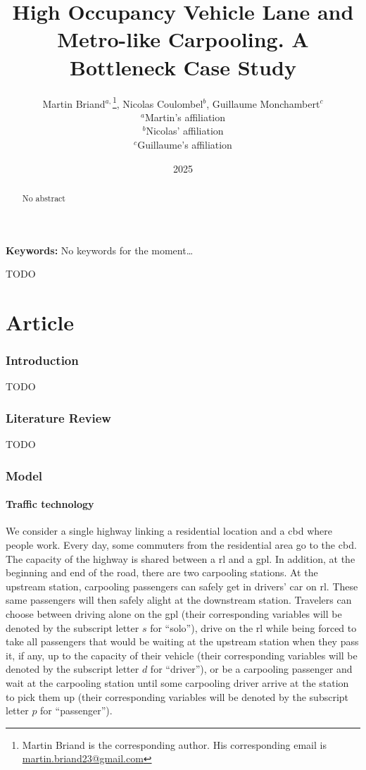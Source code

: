 \documentclass[english, a4paper]{article}
\title{High Occupancy Vehicle Lane and Metro-like Carpooling. A Bottleneck Case Study}
\author{Martin Briand$^{a,}$\footnote{Martin Briand is the corresponding author. His corresponding email is \href{mailto:martin.briand23@gmail.com}{martin.briand23@gmail.com}}, Nicolas Coulombel$^{b}$, Guillaume Monchambert$^{c}$\\
\small $^{a}$Martin’s affiliation\\
\small $^{b}$Nicolas’ affiliation\\
\small $^{c}$Guillaume’s affiliation}
\date{2025}
\theoremstyle{plain}
\theoremstyle{definition}
\theoremstyle{remark}
\newcommand{\keywords}[1]
{
    \small
    \textbf{Keywords:} #1
    \vspace{0.2cm}
}
\begin{document}
\maketitle

\begin{abstract}
    No abstract
\end{abstract}

\keywords{No keywords for the moment…}
\alert{TODO} %

\clearpage
\part{Article}

\section{Introduction}
\alert{TODO} %

\section{Literature Review}
\alert{TODO} %

\section{Model}
\subsection{Traffic technology}

We consider a single highway linking a residential location and a \acrfull{cbd} where people work. Every day, some commuters from the residential area go to the \acrshort{cbd}. The capacity of the highway is shared between a \acrfull{rl} and a \acrfull{gpl}. In addition, at the beginning and end of the road, there are two carpooling stations. At the upstream station, carpooling passengers can safely get in drivers' car on \acrshort{rl}. These same passengers will then safely alight at the downstream station. Travelers can choose between driving alone on the \acrshort{gpl} (their corresponding variables will be denoted by the subscript letter $s$ for ``solo''), drive on the \acrshort{rl} while being forced to take all passengers that would be waiting at the upstream station when they pass it, if any, up to the capacity of their vehicle (their corresponding variables will be denoted by the subscript letter $d$ for ``driver''), or be a carpooling passenger and wait at the carpooling station until some carpooling driver arrive at the station to pick them up (their corresponding variables will be denoted by the subscript letter $p$ for ``passenger'').
\end{document}
